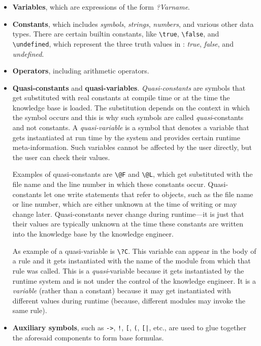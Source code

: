 \documentclass[11pt]{article}
\newcommand{\ERGO}{\mbox{\smaller{\ensuremath{\cal{E}}\smaller{{\sc{RGO}}}}}\xspace}
\newcommand{\FLSYSTEM}{\ERGO}
\newcommand{\bs}{\textbackslash}
\begin{document}
\begin{itemize}
\item  \textbf{Variables}, which are expressions of the form \emph{?Varname}.
  \index{\bs{}true}
  \index{\bs{}false}
  \index{\bs{}undefined}
\item  \textbf{Constants}, which includes \emph{symbols},  \emph{strings},
  \emph{numbers}, and various other data types.
  There are certain builtin constants, like \texttt{\bs{}true},
  \texttt{\bs{}false}, and \texttt{\bs{}undefined}, which represent the
  three truth values in \FLSYSTEM: \emph{true}, \emph{false}, and \emph{undefined}.    
\item \textbf{Operators}, including arithmetic operators.
\item \textbf{Quasi-constants} and
  \textbf{quasi-variables}. \emph{Quasi-constants}
  are symbols that get substituted
  with real constants at compile time or at the time the knowledge base is
  loaded. The substitution depends on the context in which the symbol
  occurs and this is why such symbols are called \emph{quasi}-constants and
  not constants. 
  A \emph{quasi-variable} is a symbol that denotes a variable that gets
  instantiated at run time by the system and provides certain runtime
  meta-information. Such variables cannot be affected by the user directly,
  but the user can check their values.
  
  Examples of quasi-constants are \texttt{\bs{}@F} and \texttt{\bs{}@L},
  which get substituted with the file name and the line number in which
  these constants occur. Quasi-constants let one write
  statements that refer to objects, such as the file name or line
  number, which are either unknown at the time of writing or may change
  later.  Quasi-constants never change during runtime---it is just that
  their values are typically unknown at the time these constants are
  written into the knowledge base by the knowledge engineer.

  As example of a quasi-variable is \texttt{\bs{}?C}. This variable can
  appear in the body of a rule and it gets instantiated
  with the name of the module from which that rule was called. This is
  a \emph{quasi}-variable because it gets 
  instantiated by the runtime system and is not under the control of the
  knowledge engineer. It is a \emph{variable} (rather than a constant) because
  it may get instantiated with different values during runtime (because,
  different modules may invoke the same rule).
\item \textbf{Auxiliary symbols}, such as \texttt{->}, \texttt{!},
  \texttt{[}, \texttt{(}, \texttt{[|},   etc., are used to glue together     
  the aforesaid components to form base formulas.
\end{itemize}
\end{document}
